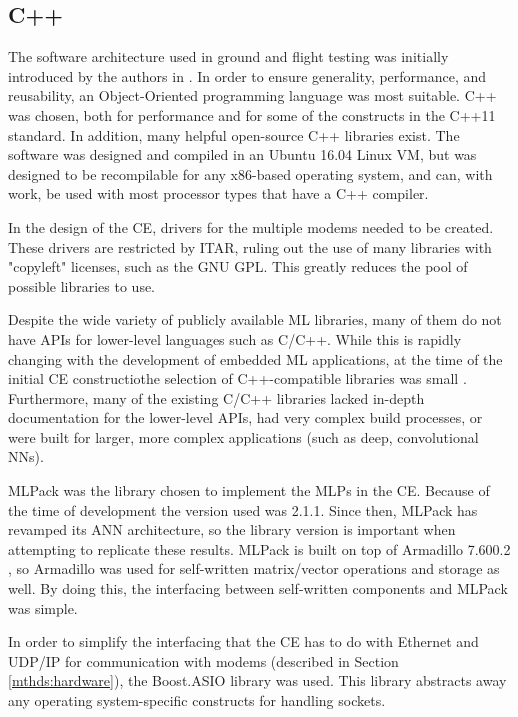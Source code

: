 \subsection{C++}
\par The software architecture used in ground and flight testing was initially introduced by the authors in \cite{tim_implementation_paper}. In order to ensure generality, performance, and reusability, an Object-Oriented programming language was most suitable. C++ was chosen, both for performance and for some of the constructs in the C++11 standard. In addition, many helpful open-source C++ libraries exist. The software was designed and compiled in an Ubuntu 16.04 Linux VM, but was designed to be recompilable for any x86-based operating system, and can, with work, be used with most processor types that have a C++ compiler.
\par In the design of the CE, drivers for the multiple modems needed to be created. These drivers are restricted by ITAR, ruling out the use of many libraries with "copyleft" licenses, such as the GNU GPL. This greatly reduces the pool of possible libraries to use. 
\par Despite the wide variety of publicly available ML libraries, many of them do not have APIs for lower-level languages such as C/C++. While this is rapidly changing with the development of embedded ML applications, at the time of the initial CE constructiothe selection of C++-compatible libraries was small \cite{tim_implementation_paper}. Furthermore, many of the existing C/C++ libraries lacked in-depth documentation for the lower-level APIs, had very complex build processes, or were built for larger, more complex applications (such as deep, convolutional NNs). 
\par MLPack \cite{placeholderCitation} was the library chosen to implement the MLPs in the CE. Because of the time of development the version used was 2.1.1. Since then, MLPack has revamped its ANN architecture, so the library version is important when attempting to replicate these results. MLPack is built on top of Armadillo 7.600.2 \cite{placeholderCitation}, so Armadillo was used for self-written matrix/vector operations and storage as well. By doing this, the interfacing between self-written components and MLPack was simple. 
\par In order to simplify the interfacing that the CE has to do with Ethernet and UDP/IP for communication with modems (described in Section \ref{mthds:hardware}), the Boost.ASIO \cite{placeholderCitation} library was used. This library abstracts away any operating system-specific constructs for handling sockets.
